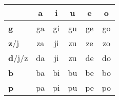 






\bigskip
\begin{center}	
\Huge

\begin{tabular}{m{2.5cm}||c|c|c|c|c|}
          &\textbf{a}& \textbf{i}& \textbf{u}& \textbf{e}& \textbf{o}\\ \hline \hline 
\textbf{g}&ga&gi&gu&ge&go\\ \hline 
\textbf{z}/j&za&ji&zu&ze&zo\\ \hline 
\textbf{d}/j/z&da&ji&zu&de&do\\ \hline 
\textbf{b}&ba&bi&bu&be&bo\\ \hline 
\textbf{p}&pa&pi&pu&pe&po\\ \hline 
\end{tabular}
\end{center}
